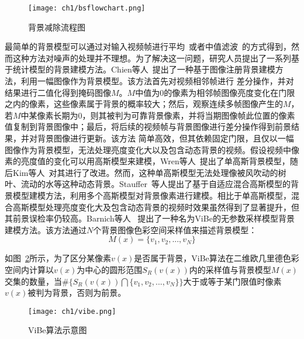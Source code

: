\begin{figure}[htb]
  \centering%
  {\texttt{[image: ch1/bsflowchart.png]}}%
  \caption{背景减除流程图~\cite{BouwmansOverview}}
  \label{fig:2}
\end{figure}
最简单的背景模型可以通过对输入视频帧进行平均~\cite{LeeAverage}或者中值滤波~\cite{MF}的方式得到，然而这种方法对噪声的处理并不理想。为了解决这一问题，研究人员提出了一系列基于统计模型的背景建模方法。Chien等人~\cite{Chien2002Efficient}提出了一种基于图像注册背景建模方法，利用一幅图像作为背景模型。该方法首先对视频相邻帧进行
差分操作，并对结果进行二值化得到掩码图像$M$。$M$中值为0的像素为相邻帧图像亮度变化在门限之内的像素，这些像素属于背景的概率较大；然后，观察连续多帧图像产生的$M$，若$M$中某像素长期为0，则其被判为可靠背景像素，并将当期图像帧此位置的像素值复制到背景图像中；最后，将后续的视频帧与背景图像进行差分操作得到前景结果，并对背景图像进行更新。该方法
简单高效，但其依赖固定门限，且仅以一幅图像作为背景模型，无法处理亮度变化大以及包含动态背景的视频。假设视频中像素的亮度值的变化可以用高斯模型来建模，Wren等人~\cite{Wren}提出了单高斯背景模型，随后Kim等人~\cite{kim2007robust}对其进行了改进。然而，这种单高斯模型无法处理像被风吹动的树叶、流动的水等这种动态背景。Stauffer~\cite{stauffer1999adaptive}等人提出了基于自适应混合高斯模型的背景模型建模方法，利用多个高斯模型对背景像素进行建模。相比于单高斯模型，混合高斯模型处理亮度变化大及包含动态背景的视频时效果虽然得到了显著提升，但其前景误检率仍较高。Barnich等人~ \cite{Barnich2011ViBe}提出了一种名为ViBe的无参数采样模型背景建模方法。该方法通过$N$个背景图像色彩空间采样值来描述背景模型：
$$M(x)=\{v_{1},v_{2},...,v_{N}\}$$ \par
如图~\ref{fig:vibe}所示，为了区分某像素$v(x)$是否属于背景，ViBe算法在二维欧几里德色彩空间内计算以$v(x)$为中心的圆形范围$S_{R}(v(x))$内的采样值与背景模型$M(x)$交集的数量，当$\#\{S_{R}(v(x))\bigcap\{v_{1},v_{2},...,v_{N}\} \}$大于或等于某门限值时像素$v(x)$被判为背景，否则为前景。

\begin{figure}[ht]
  \centering%
  {\texttt{[image: ch1/vibe.png]}}%
  \caption{ViBe算法示意图~\cite{Barnich2011ViBe}}
  \label{fig:vibe}
\end{figure} \par



